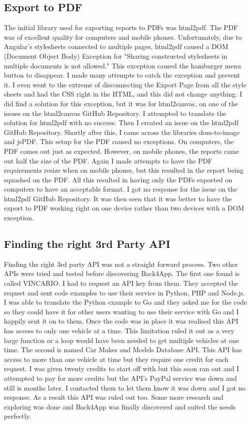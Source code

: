 \subsection{Export to PDF}
The initial library used for exporting reports to PDFs was html2pdf. The PDF was of excellent quality for computers and mobile phones. Unfortunately, due to Angular's stylesheets connected to multiple pages, html2pdf caused a DOM (Document Object Body) Exception for "Sharing constructed stylesheets in multiple documents is not allowed." This exception caused the hamburger menu button to disappear. I made many attempts to catch the exception and prevent it. I even went to the extreme of disconnecting the Export Page from all the style sheets and had the CSS right in the HTML, and this did not change anything. I did find a solution for this exception, but it was for html2canvas, on one of the issues on the html2canvas GitHub Repository. I attempted to translate the solution for html2pdf with no success. Then I created an issue on the html2pdf GitHub Repository. Shortly after this, I came across the libraries dom-to-image and jsPDF. This setup for the PDF caused no exceptions. On computers, the PDF comes out just as expected. However, on mobile phones, the reports came out half the size of the PDF. Again I made attempts to have the PDF requirements resize when on mobile phones, but this resulted in the report being squashed on the PDF. All this resulted in having only the PDFs exported on computers to have an acceptable format. I got no response for the issue on the html2pdf GitHub Repository. It was then seen that it was better to have the export to PDF working right on one device rather than two devices with a DOM exception.

\subsection{Finding the right 3rd Party API}
Finding the right 3rd party API was not a straight forward process. Two other APIs were tried and tested before discovering Back4App. The first one found is called VINCARIO. I had to request an API key from them. They accepted the request and sent code examples to use their service in Python, PHP and Node.js. I was able to translate the Python example to Go and they asked me for the code so they could have it for other users wanting to use their service with Go and I happily sent it on to them. Once the code was in place it was realised this API has access to only one vehicle at a time. This limitation ruled it out as a very large function or a loop would have been needed to get multiple vehicles at one time. The second is named Car Makes and Models Database API. This API has access to more than one vehicle at time but they require one credit for each request. I was given twenty credits to start off with but this soon ran out and I attempted to pay for more credits but the API's PayPal service was down and still is months later. I contacted them to let them know it was down and I got no response. As a result this API was ruled out too. Some more research and exploring was done and Back4App was finally discovered and suited the needs perfectly. 


